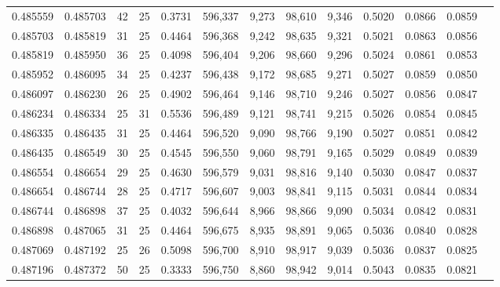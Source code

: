 \begin{tabular}{rrrrrrrrrrrrr}
0.485559 & 0.485703 &    42 &  25 &                                     0.3731 & 596,337 &   9,273 &  98,610 &   9,346 & 0.5020 & 0.0866 & 0.0859 \\
0.485703 & 0.485819 &    31 &  25 &                                     0.4464 & 596,368 &   9,242 &  98,635 &   9,321 & 0.5021 & 0.0863 & 0.0856 \\
0.485819 & 0.485950 &    36 &  25 &                                     0.4098 & 596,404 &   9,206 &  98,660 &   9,296 & 0.5024 & 0.0861 & 0.0853 \\
0.485952 & 0.486095 &    34 &  25 &                                     0.4237 & 596,438 &   9,172 &  98,685 &   9,271 & 0.5027 & 0.0859 & 0.0850 \\
0.486097 & 0.486230 &    26 &  25 &                                     0.4902 & 596,464 &   9,146 &  98,710 &   9,246 & 0.5027 & 0.0856 & 0.0847 \\
0.486234 & 0.486334 &    25 &  31 &                                     0.5536 & 596,489 &   9,121 &  98,741 &   9,215 & 0.5026 & 0.0854 & 0.0845 \\
0.486335 & 0.486435 &    31 &  25 &                                     0.4464 & 596,520 &   9,090 &  98,766 &   9,190 & 0.5027 & 0.0851 & 0.0842 \\
0.486435 & 0.486549 &    30 &  25 &                                     0.4545 & 596,550 &   9,060 &  98,791 &   9,165 & 0.5029 & 0.0849 & 0.0839 \\
0.486554 & 0.486654 &    29 &  25 &                                     0.4630 & 596,579 &   9,031 &  98,816 &   9,140 & 0.5030 & 0.0847 & 0.0837 \\
0.486654 & 0.486744 &    28 &  25 &                                     0.4717 & 596,607 &   9,003 &  98,841 &   9,115 & 0.5031 & 0.0844 & 0.0834 \\
0.486744 & 0.486898 &    37 &  25 &                                     0.4032 & 596,644 &   8,966 &  98,866 &   9,090 & 0.5034 & 0.0842 & 0.0831 \\
0.486898 & 0.487065 &    31 &  25 &                                     0.4464 & 596,675 &   8,935 &  98,891 &   9,065 & 0.5036 & 0.0840 & 0.0828 \\
0.487069 & 0.487192 &    25 &  26 &                                     0.5098 & 596,700 &   8,910 &  98,917 &   9,039 & 0.5036 & 0.0837 & 0.0825 \\
0.487196 & 0.487372 &    50 &  25 &                                     0.3333 & 596,750 &   8,860 &  98,942 &   9,014 & 0.5043 & 0.0835 & 0.0821 \\

\end{tabular}
